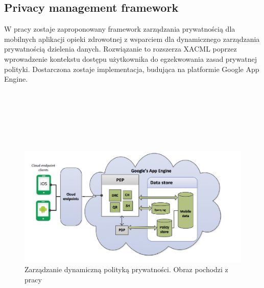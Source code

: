 \subsection{Privacy management framework \cite{Ammar2014}}
W pracy zostaje zaproponowany framework zarządzania prywatnością dla mobilnych aplikacji opieki zdrowotnej z wsparciem dla dynamicznego zarządzania prywatnością dzielenia danych. Rozwiązanie to rozszerza XACML poprzez wprowadzenie kontekstu dostępu użytkownika do egzekwowania zasad prywatnej polityki. Dostarczona zostaje implementacja, budująca na platformie Google App Engine.\\ \\ \\ \\ \\ \\ \\

\begin{figure}[h!]
	\centering
		\includegraphics[scale=0.6]{MobiDyc_Private_Mobile-Based_Health_Data_Sharing_Through_fig1}
	\caption{Zarządzanie dynamiczną polityką prywatności. Obraz pochodzi z pracy \cite{Ammar2014}}
\end{figure}


